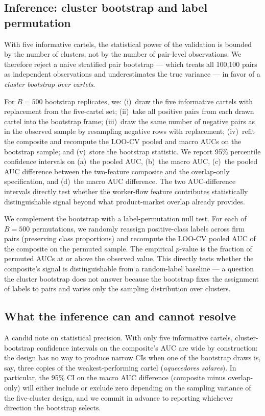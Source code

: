 \subsection{Inference: cluster bootstrap and label permutation}\label{sec:strategy_inference}

With five informative cartels, the statistical power of the validation is bounded by the number of clusters, not by the number of pair-level observations. We therefore reject a naive stratified pair bootstrap --- which treats all 100{,}100 pairs as independent observations and underestimates the true variance --- in favor of a \emph{cluster bootstrap over cartels}.

For $B = 500$ bootstrap replicates, we: (i)~draw the five informative cartels with replacement from the five-cartel set; (ii)~take all positive pairs from each drawn cartel into the bootstrap frame; (iii)~draw the same number of negative pairs as in the observed sample by resampling negative rows with replacement; (iv)~refit the composite and recompute the LOO-CV pooled and macro AUCs on the bootstrap sample; and (v)~store the bootstrap statistic. We report 95\% percentile confidence intervals on (a)~the pooled AUC, (b)~the macro AUC, (c)~the pooled AUC difference between the two-feature composite and the overlap-only specification, and (d)~the macro AUC difference. The two AUC-difference intervals directly test whether the worker-flow feature contributes statistically distinguishable signal beyond what product-market overlap already provides.

We complement the bootstrap with a label-permutation null test. For each of $B = 500$ permutations, we randomly reassign positive-class labels across firm pairs (preserving class proportions) and recompute the LOO-CV pooled AUC of the composite on the permuted sample. The empirical $p$-value is the fraction of permuted AUCs at or above the observed value. This directly tests whether the composite's signal is distinguishable from a random-label baseline --- a question the cluster bootstrap does not answer because the bootstrap fixes the assignment of labels to pairs and varies only the sampling distribution over clusters.

\subsection{What the inference can and cannot resolve}\label{sec:strategy_inference_honesty}

A candid note on statistical precision. With only five informative cartels, cluster-bootstrap confidence intervals on the composite's AUC are wide by construction: the design has no way to produce narrow CIs when one of the bootstrap draws is, say, three copies of the weakest-performing cartel (\emph{aquecedores solares}). In particular, the 95\% CI on the macro AUC difference (composite minus overlap-only) will either include or exclude zero depending on the sampling variance of the five-cluster design, and we commit in advance to reporting whichever direction the bootstrap selects.

